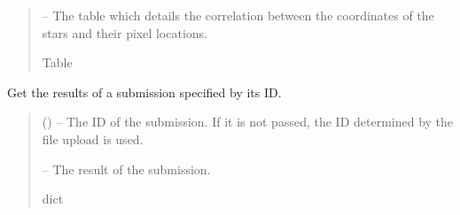\documentclass[letterpaper,11pt,english]{sphinxmanual}
\begin{document}
\begin{savenotes}
\begin{fulllineitems}
\begin{savenotes}
\begin{fulllineitems}
\begin{quote}
\begin{description}
\begin{itemize}
\end{itemize}

\sphinxAtStartPar
{} – The table which details the correlation between the coordinates of
the stars and their pixel locations.

\sphinxAtStartPar
Table

\end{description}\end{quote}

\end{fulllineitems}\end{savenotes}


\begin{savenotes}\begin{fulllineitems}
\label{\detokenize{code/opihiexarata.astrometry.webclient:opihiexarata.astrometry.webclient.AstrometryNetWebAPIEngine.get_submission_results}}
\pysigstartsignatures
{}
\pysigstopsignatures
\sphinxAtStartPar
Get the results of a submission specified by its ID.
\begin{quote}\begin{description}
\sphinxAtStartPar
{} () – The ID of the submission. If it is not passed, the ID determined
by the file upload is used.

\sphinxAtStartPar
{} – The result of the submission.

\sphinxAtStartPar
dict

\end{description}\end{quote}

\end{fulllineitems}\end{savenotes}


\end{fulllineitems}
\end{savenotes}
\end{document}
